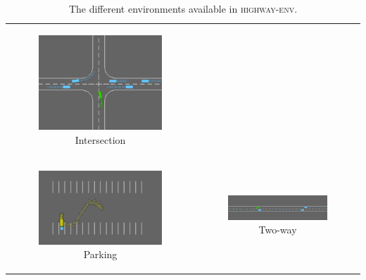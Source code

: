 \begin{table}[ht]
\begin{tabular}{cc}
		\begin{subfigure}{0.49\textwidth}\centering\includegraphics[width=\columnwidth]{img/intersection}\caption{Intersection}\end{subfigure}\\
		\begin{subfigure}{0.49\textwidth}\centering\includegraphics[width=\columnwidth]{img/parking}\caption{Parking}\end{subfigure}&
		\begin{subfigure}{0.49\textwidth}\centering\includegraphics[width=\columnwidth]{img/two-way}\caption{Two-way}\end{subfigure}\\
	\end{tabular}
	\caption{The different environments available in \textsc{highway-env}.}
	\label{tab:environments}
\end{table}

